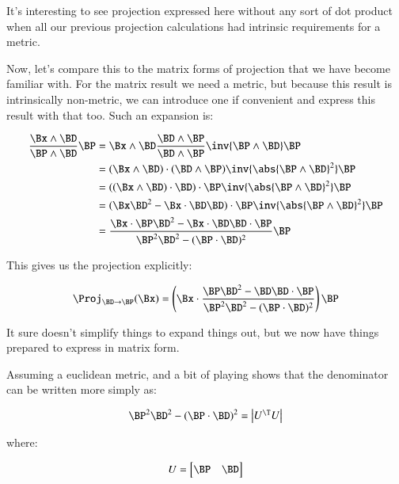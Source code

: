 It's interesting to see projection expressed here without any sort of dot
product when all our previous projection calculations had intrinsic
requirements for a metric.

Now, let's compare this to the matrix forms of projection that we have become familiar with.  For the matrix result we need a metric, but because
this result is intrinsically non-metric, we can introduce one if convenient and express this result with that too.  Such an expansion is:

\begin{align*}
\frac{\Bx \wedge \BD}{\BP \wedge \BD} \BP
&=
\Bx \wedge \BD
\frac{\BD \wedge \BP}{\BD \wedge \BP}
\inv{\BP \wedge \BD}
\BP \\
&=
(\Bx \wedge \BD) \cdot (\BD \wedge \BP)
\inv{\abs{\BP \wedge \BD}^2}
\BP \\
&=
((\Bx \wedge \BD) \cdot \BD) \cdot \BP
\inv{\abs{\BP \wedge \BD}^2}
\BP \\
&=
(
\Bx \BD^2 - \Bx \cdot \BD \BD
) \cdot \BP
\inv{\abs{\BP \wedge \BD}^2}
\BP \\
&=
\frac{\Bx \cdot \BP \BD^2 - \Bx \cdot \BD \BD \cdot \BP}
{\BP^2 \BD^2 - (\BP \cdot \BD)^2
}
\BP \\
\end{align*}

This gives us the projection explicitly:

\begin{equation}\label{eqn:oblique_proj:obliqueProjNearMatrixForm}
\Proj_{\BD \rightarrow \BP}(\Bx)
=
\left(\Bx \cdot \frac{\BP \BD^2 - \BD \BD \cdot \BP}{\BP^2 \BD^2 - (\BP \cdot \BD)^2}\right)
\BP
\end{equation}

It sure doesn't simplify things to expand things out, but we now have things prepared to express in matrix form.

Assuming a euclidean metric, and a bit of playing shows that the denominator can be written more simply as:

\[
\BP^2 \BD^2 - (\BP \cdot \BD)^2 =
\begin{vmatrix}
U^\T U
\end{vmatrix}
\]

where:

\[
U =
\begin{bmatrix}
\BP & \BD \\
\end{bmatrix}
\]

